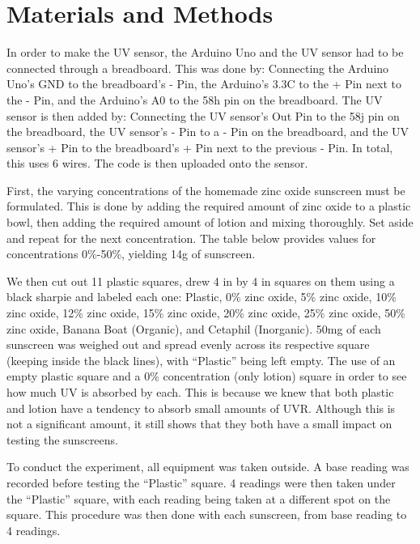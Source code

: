 \documentclass{article}
\begin{document}
\section{Materials and Methods}
In order to make the UV sensor, the Arduino Uno and the UV sensor had to be connected through a breadboard. This was done by: Connecting the Arduino Uno’s GND to the breadboard’s - Pin, the Arduino’s 3.3C to the + Pin next to the - Pin, and the Arduino’s A0 to the 58h pin on the breadboard. The UV sensor is then added by: Connecting the UV sensor’s Out Pin to the 58j pin on the breadboard, the UV sensor’s - Pin to a - Pin on the breadboard, and the UV sensor’s + Pin to the breadboard’s + Pin next to the previous - Pin. In total, this uses 6 wires. The code is then uploaded onto the sensor.

First, the varying concentrations of the homemade zinc oxide sunscreen must be formulated. This is done by adding the required amount of zinc oxide to a plastic bowl, then adding the required amount of lotion and mixing thoroughly. Set aside and repeat for the next concentration. The table below provides values for concentrations 0\%-50\%, yielding 14g of sunscreen.

We then cut out 11 plastic squares, drew 4 in by 4 in squares on them using a black sharpie and labeled each one: Plastic, 0\% zinc oxide, 5\% zinc oxide, 10\% zinc oxide, 12\% zinc oxide, 15\% zinc oxide, 20\% zinc oxide, 25\% zinc oxide, 50\% zinc oxide, Banana Boat (Organic), and Cetaphil (Inorganic). 50mg of each sunscreen was weighed out and spread evenly across its respective square (keeping inside the black lines), with “Plastic” being left empty. The use of an empty plastic square and a 0\% concentration (only lotion) square in order to see how much UV is absorbed by each. This is because we knew that both plastic and lotion have a tendency to absorb small amounts of UVR. Although this is not a significant amount, it still shows that they both have a small impact on testing the sunscreens.

To conduct the experiment, all equipment was taken outside. A base reading was recorded before testing the “Plastic” square. 4 readings were then taken under the “Plastic” square, with each reading being taken at a different spot on the square. This procedure was then done with each sunscreen, from base reading to 4 readings. 
\end{document}
